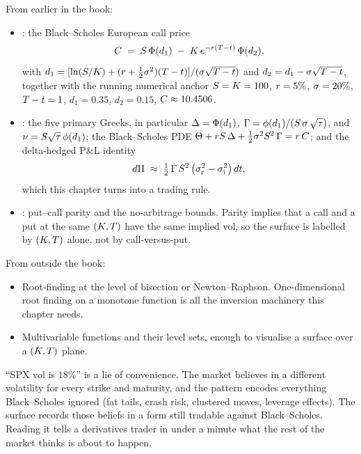\begin{backgroundbox}[Prerequisites]
From earlier in the book:
\begin{itemize}
  \item {}: the Black--Scholes European call
  price
  \begin{equation*}
    C \;=\; S\,\Phi(d_1) \;-\; K\,e^{-r(T-t)}\,\Phi(d_2),
  \end{equation*}
  with $d_1 = [\ln(S/K) + (r + \tfrac12 \sigma^2)(T
  - t)]/(\sigma\sqrt{T - t})$ and $d_2 = d_1 - \sigma\sqrt{T
  - t}$, together with the running numerical anchor $S =
  K = 100$, $r = 5\%$, $\sigma = 20\%$, $T - t = 1$,
  $d_1 = 0.35$, $d_2 = 0.15$, $C \approx 10.4506$.
  \item {}: the five primary Greeks, in
  particular $\Delta = \Phi(d_1)$, $\Gamma =
  \phi(d_1)/(S\,\sigma\,\sqrt\tau)$, and
  $\nu = S\sqrt\tau\,\phi(d_1)$; the Black--Scholes PDE
  $\Theta + rS\,\Delta + \tfrac12\sigma^2S^2\,\Gamma =
  r\,C$; and the delta-hedged P\&L identity
  \begin{equation*}
    d\Pi \;\approx\; \tfrac12\,\Gamma\,S^2\,
    \bigl(\sigma_{\text{r}}^2 - \sigma_{\text{i}}^2\bigr)\,dt,
  \end{equation*}
  which this chapter turns into a trading rule.
  \item {}: put--call parity and the
  no-arbitrage bounds. Parity implies that a call and a put at the
  same $(K, T)$ have the same implied vol, so the
  surface is labelled by $(K, T)$ alone, not by
  call-versus-put.
\end{itemize}
From outside the book:
\begin{itemize}
  \item Root-finding at the level of bisection or Newton--Raphson.
  One-dimensional root finding on a monotone function is all the
  inversion machinery this chapter needs.
  \item Multivariable functions and their level sets, enough to
  visualise a surface over a $(K, T)$ plane.
\end{itemize}
\end{backgroundbox}

\begin{intuitionbox}
``SPX vol is $18\%$'' is a lie of convenience. The market believes
in a different volatility for every strike and maturity, and the
pattern encodes everything Black--Scholes ignored (fat tails, crash
risk, clustered moves, leverage effects). The surface records
those beliefs in a form still tradable against Black--Scholes.
Reading it tells a derivatives trader in under a minute what the
rest of the market thinks is about to happen.
\end{intuitionbox}

